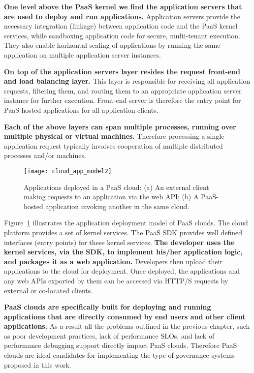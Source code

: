 \textbf{One level above the PaaS kernel we find the application servers that are used to deploy and run
applications.} Application servers provide the necessary integration (linkage) between application code and the
PaaS kernel services, while sandboxing application code for secure, multi-tenant execution. They also
enable horizontal scaling of applications by running the same application on multiple application server
instances.

\textbf{On top of the application servers layer resides the request
front-end and load balancing layer.} This layer is responsible
for receiving all application requests, filtering them, and routing them to an appropriate application
server instance for further execution. Front-end server is therefore the entry point for PaaS-hosted
applications for all application clients.

\textbf{Each of the above layers can span multiple processes, running over multiple physical or virtual
machines.} Therefore processing a single application request typically involves cooperation
of multiple distributed processes and/or machines.

\begin{figure}
\centering
\texttt{[image: cloud\_app\_model2]}
\caption{Applications deployed in a PaaS cloud: (a) An external client making requests
to an application via the web API;
(b) A PaaS-hosted application invoking another in the same cloud.
\label{fig:cloud_app_model}
}
\end{figure}

Figure~\ref{fig:cloud_app_model} illustrates the application deployment model of PaaS clouds. 
The cloud platform provides a set of kernel services. 
The PaaS SDK provides well defined interfaces (entry points) for these kernel services.  
\textbf{The developer uses the kernel services, via the SDK, to implement his/her application logic, and packages 
it as a web application.} Developers then
upload their applications to the cloud for deployment.
Once deployed, the applications and any web APIs exported by them can be accessed 
via HTTP/S requests by external or co-located clients.

\textbf{PaaS clouds are specifically built for deploying and running applications
that are directly consumed by end users and other client applications.} As a result all the problems 
outlined in the previous chapter, such as poor development practices, lack of performance SLOs, and lack of performance 
debugging support directly impact PaaS clouds. Therefore PaaS clouds are ideal candidates for implementing the type
of governance systems proposed in this work. 

